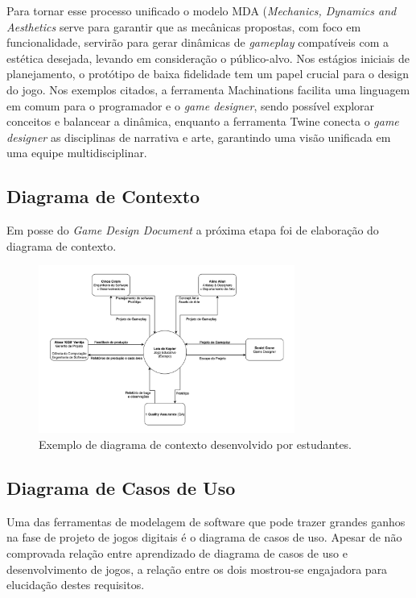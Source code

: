 \documentclass[12pt, onecolumn]{IEEEtran}
\begin{document}
Para tornar esse processo unificado o modelo MDA (\textit{Mechanics, Dynamics and Aesthetics} serve para garantir que as mecânicas propostas, com foco em funcionalidade, servirão para gerar dinâmicas de \textit{gameplay} compatíveis com a estética desejada, levando em consideração o público-alvo. Nos estágios iniciais de planejamento, o protótipo de baixa fidelidade tem um papel crucial para o design do jogo. Nos exemplos citados, a ferramenta Machinations facilita uma linguagem em comum para o programador e o \textit{game designer}, sendo possível explorar conceitos e balancear a dinâmica, enquanto a ferramenta Twine conecta o \textit{game designer} as disciplinas de narrativa e arte, garantindo uma visão unificada em uma equipe multidisciplinar.

\subsection{Diagrama de Contexto}

Em posse do \textit{Game Design Document} a próxima etapa foi de elaboração do diagrama de contexto.


\begin{figure}[H]
    \centering
    \includegraphics[width=0.75\textwidth]{imagens/exemplo-diagrama-de-contexto.png}
    \caption{Exemplo de diagrama de contexto desenvolvido por estudantes.}
    \label{fig:mesh1}
\end{figure}


\subsection{Diagrama de Casos de Uso}

Uma das ferramentas de modelagem de software que pode trazer grandes ganhos na fase de projeto de jogos digitais é o diagrama de casos de uso. Apesar de não comprovada relação entre aprendizado de diagrama de casos de uso e desenvolvimento de jogos\cite{b26}, a relação entre os dois mostrou-se engajadora para elucidação destes requisitos.
\end{document}
